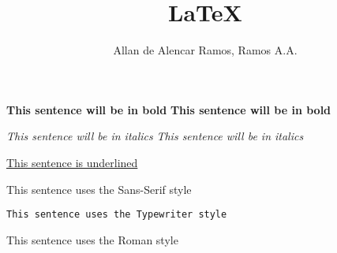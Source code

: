 \documentclass[12pt, a4paper]{article}
\begin{document}
\title{LaTeX}
\author{Allan de Alencar Ramos, Ramos A.A.}
\maketitle

\textbf{This sentence will be in bold}\newline
\bfseries{This sentence will be in bold}\newline

\textit{This sentence will be in italics}\newline
\itshape{This sentence will be in italics}\newline

\underline{This sentence is underlined}\newline

\textsf{This sentence uses the Sans-Serif style}\newline
{}\newline

\texttt{This sentence uses the Typewriter style}\newline
{}\newline

\textrm{This sentence uses the Roman style}\newline
{}\newline
\end{document}
